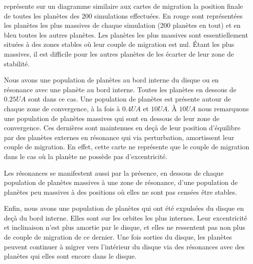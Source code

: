  représente sur un diagramme similaire aux cartes de migration la position finale de toutes les planètes des 200 simulations effectuées. En rouge sont représentées les planètes les plus massives de chaque simulation (200 planètes en tout) et en bleu toutes les autres planètes. Les planètes les plus massives sont essentiellement situées à des zones stables où leur couple de migration est nul. Étant les plus massives, il est difficile pour les autres planètes de les écarter de leur zone de stabilité. 

Nous avons une population de planètes au bord interne du disque ou en résonance avec une planète au bord interne. Toutes les
planètes en dessous de $0.25\unit{UA}$ sont dans ce cas. Une population de planètes est présente autour de chaque zone de
convergence, à la fois à $0.4\unit{UA}$ et $10\unit{UA}$. À $10\unit{UA}$ nous remarquons une population de planètes massives
qui sont en dessous de leur zone de convergence. Ces dernières sont maintenues en deçà de leur position d'équilibre par des
planètes externes en résonance qui via perturbation, amortissent leur couple de migration. En effet, cette carte ne représente
que le couple de migration dans le cas où la planète ne possède pas d'excentricité. 

Les résonances se manifestent aussi par la présence, en dessous de chaque population de planètes massives à une zone de
résonance, d'une population de planètes peu massives à des positions où elles ne sont pas censées être stables. 

Enfin, nous avons une population de planètes qui ont été expulsées du disque en deçà du bord interne. Elles sont sur les orbites
les plus internes. Leur excentricité et inclinaison n'est plus amortie par le disque, et elles ne ressentent pas non plus de
couple de migration de ce dernier. Une fois sorties du disque, les planètes peuvent continuer à migrer vers l'intérieur du
disque via des résonances avec des planètes qui elles sont encore dans le disque. 

